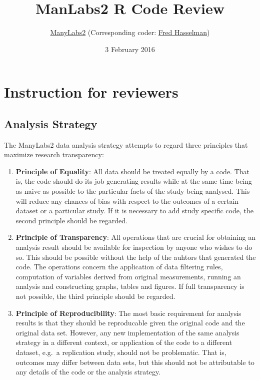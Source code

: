 \documentclass[]{article}
\title{ManLabs2 R Code Review}
\author{\href{https://osf.io/8cd4r}{ManyLabs2} (Corresponding coder:
\href{https://osf.io/ujgs6/}{Fred Hasselman})}
\date{3 February 2016}
\begin{document}
\maketitle


{
\hypersetup{linkcolor=black}
\setcounter{tocdepth}{4}
\tableofcontents
}
\section{Instruction for reviewers}\label{instruction-for-reviewers}

\subsection{Analysis Strategy}\label{analysis-strategy}

The ManyLabs2 data analysis strategy attempts to regard three principles
that maximize research transparency:

\begin{enumerate}
\def\labelenumi{\arabic{enumi}.}
\item
  \textbf{Principle of Equality}: All data should be treated equally by
  a code. That is, the code should do its job generating results while
  at the same time being as naive as possible to the particular facts of
  the study being analysed. This will reduce any chances of bias with
  respect to the outcomes of a certain dataset or a particular study. If
  it is necessary to add study specific code, the second principle
  should be regarded.
\item
  \textbf{Principle of Transparency}: All operations that are crucial
  for obtaining an analysis result should be available for inspection by
  anyone who wishes to do so. This should be possible without the help
  of the auhtors that generated the code. The operations concern the
  application of data filtering rules, computation of variables derived
  from original measurements, running an analysis and constructing
  graphs, tables and figures. If full transparency is not possible, the
  third principle should be regarded.
\item
  \textbf{Principle of Reproducibility}: The most basic requirement for
  analysis results is that they should be reproducable given the
  original code and the original data set. However, any new
  implementation of the same analysis strategy in a different context,
  or application of the code to a different dataset, e.g.~a replication
  study, should not be problematic. That is, outcomes may differ between
  data sets, but this should not be attributable to any details of the
  code or the analysis strategy.
\end{enumerate}
\end{document}
